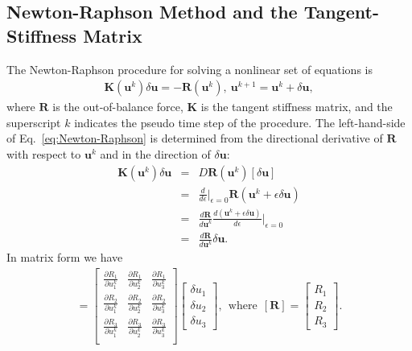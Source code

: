 \subsection{Newton-Raphson Method and the Tangent-Stiffness Matrix}
The Newton-Raphson procedure for solving a nonlinear set of equations is \cite{JavierBonet:2008uxa}
%
\begin{eqnarray}
\pmb{K}(\pmb{u}^k) \delta \pmb{u} = - \pmb{R}(\pmb{u}^k), \ \pmb{u}^{k+1} = \pmb{u}^k + \delta \pmb{u},
\label{eq:Newton-Raphson}
\end{eqnarray}
%
where $\pmb{R}$ is the out-of-balance force, $\pmb{K}$ is the tangent stiffness matrix, and the superscript $k$ indicates the pseudo time step of the procedure. The left-hand-side of  Eq.\ \eqref{eq:Newton-Raphson} is determined from the directional derivative of $\pmb{R}$ with respect to $\pmb{u}^k$ and in the direction of $\delta \pmb{u}$:
%
\begin{eqnarray}
\pmb{K}(\pmb{u}^k) \delta \pmb{u} &=& D\pmb{R}(\pmb{u}^k)[\delta \pmb{u}] \nonumber\\
%
&=& \frac{d}{d\epsilon} \bigg|_{\epsilon=0}\pmb{R}(\pmb{u}^k + \epsilon \delta \pmb{u}) \nonumber\\
&=& \frac{d \pmb{R}}{d\pmb{u}^k} \frac{d(\pmb{u}^k + \epsilon \delta \pmb{u})}{d\epsilon} \bigg|_{\epsilon=0} \nonumber\\
&=& \frac{d \pmb{R}}{d\pmb{u}^k} \delta \pmb{u}.
\label{eq:DR[u]}
\end{eqnarray}
%
In matrix form we have
%
\begin{eqnarray}
[\pmb{K}(\pmb{u}^k)][\delta \pmb{u}] =
%
\begin{bmatrix}
\frac{\partial R_1}{\partial u_1^k} & \frac{\partial R_1}{\partial u_2^k} & \frac{\partial R_1}{\partial u_3^k} \\
%
\frac{\partial R_2}{\partial u_1^k} & \frac{\partial R_2}{\partial u_2^k} & \frac{\partial R_2}{\partial u_3^k} \\
%
\frac{\partial R_3}{\partial u_1^k} & \frac{\partial R_3}{\partial u_2^k} & \frac{\partial R_3}{\partial u_3^k} \\
\end{bmatrix}
%
\begin{bmatrix}
\delta u_1 \\ \delta u_2 \\ \delta u_3
\end{bmatrix}, \ \ \text{where} \ \ 
%
[\pmb{R}] = 
\begin{bmatrix}
R_1 \\ R_2 \\ R_3
\end{bmatrix}.
\label{eq:DR[u]_matrix}
\end{eqnarray}
%

